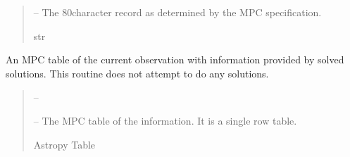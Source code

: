 \documentclass[letterpaper,11pt,english]{sphinxmanual}
\begin{document}
\begin{savenotes}
\begin{fulllineitems}
\begin{savenotes}
\begin{fulllineitems}
\begin{quote}
\begin{description}
\sphinxAtStartPar
{} – The 80\sphinxhyphen{}character record as determined by the MPC specification.

\sphinxAtStartPar
str

\end{description}\end{quote}

\end{fulllineitems}\end{savenotes}


\begin{savenotes}\begin{fulllineitems}
\label{\detokenize{code/opihiexarata.opihi.solution:opihiexarata.opihi.solution.OpihiSolution.mpc_table_row}}
\pysigstartsignatures
{}
\pysigstopsignatures
\sphinxAtStartPar
An MPC table of the current observation with information provided
by solved solutions. This routine does not attempt to do any solutions.
\begin{quote}\begin{description}
\sphinxAtStartPar
{} – 

\sphinxAtStartPar
{} – The MPC table of the information. It is a single row table.

\sphinxAtStartPar
Astropy Table

\end{description}\end{quote}

\end{fulllineitems}\end{savenotes}



\end{fulllineitems}
\end{savenotes}
\end{document}
